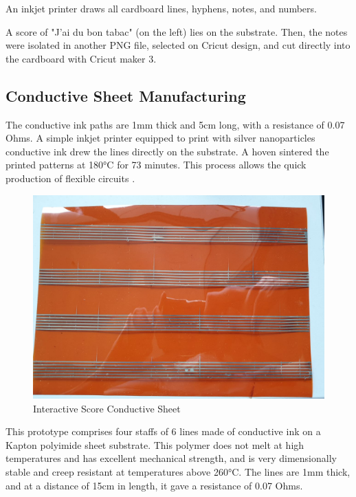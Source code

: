 An inkjet printer draws all cardboard lines, hyphens, notes, and numbers.

A score of "J'ai du bon tabac" (on the left) lies on the substrate. Then, the notes were isolated in another PNG file, selected on Cricut design, and cut directly into the cardboard with Cricut maker 3.


\subsection{Conductive Sheet Manufacturing}

The conductive ink paths are 1mm thick and 5cm long, with a resistance of 0.07 Ohms. A simple inkjet printer equipped to print with silver nanoparticles conductive ink drew the lines directly on the substrate. A hoven sintered the printed patterns at 180°C for 73 minutes. This process allows the quick production of flexible circuits \cite{khan2019soft}.

\begin{figure}[h]
   \centering
   \includegraphics{images/IS_conductive_sheet.jpeg}
   \caption{Interactive Score Conductive Sheet}
   \label{fig:IS_conductive_sheet}
\end{figure}

This prototype comprises four staffs of 6 lines made of conductive ink on a Kapton polyimide sheet substrate. This polymer does not melt at high temperatures and has excellent mechanical strength, and is very dimensionally stable and creep resistant at temperatures above 260°C. The lines are 1mm thick, and at a distance of 15cm in length, it gave a resistance of 0.07 Ohms.

